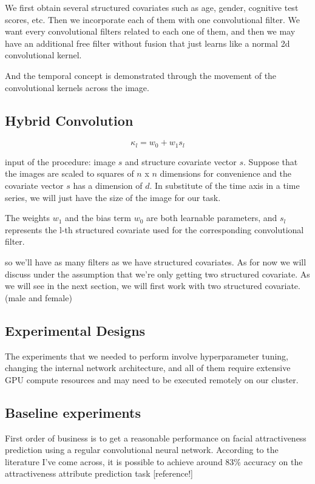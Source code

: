 \documentclass[12pt]{article}
\begin{document}
We first obtain several structured covariates such as age, gender, cognitive test scores, etc. Then we incorporate each of them with one convolutional filter. We want every convolutional filters related to each one of them, and then we may have an additional free filter without fusion that just learns like a normal 2d convolutional kernel. 

And the temporal concept is demonstrated through the movement of the convolutional kernels across the image.

\subsection{Hybrid Convolution}

$$\kappa_l = w_0 + w_1 s_l$$ 

input of the procedure: image $s$ and structure covariate vector $s$.
Suppose that the images are scaled to squares of $n$ x $n$ dimensions for convenience and the covariate vector $s$ has a dimension of $d$. In substitute of the time axis in a time series, we will just have the size of the image for our task. 

The weights $w_1$ and the bias term $w_0$ are both learnable parameters, and $s_l$ represents the l-th structured covariate used for the corresponding convolutional filter.  

so we'll have as many filters as we have structured covariates.
As for now we will discuss under the assumption that we're only getting two structured covariate. As we will see in the next section, we will first work with two structured covariate. (male and female) 

\subsection{Experimental Designs}
The experiments that we needed to perform involve hyperparameter tuning, changing the internal network architecture, and all of them require extensive GPU compute resources and may need to be executed remotely on our cluster. 

\subsection{Baseline experiments}
First order of business is to get a reasonable performance on facial attractiveness prediction using a regular convolutional neural network. According to the literature I've come across, it is possible to achieve around 83\% accuracy on the attractiveness attribute prediction task [reference!]
\end{document}
